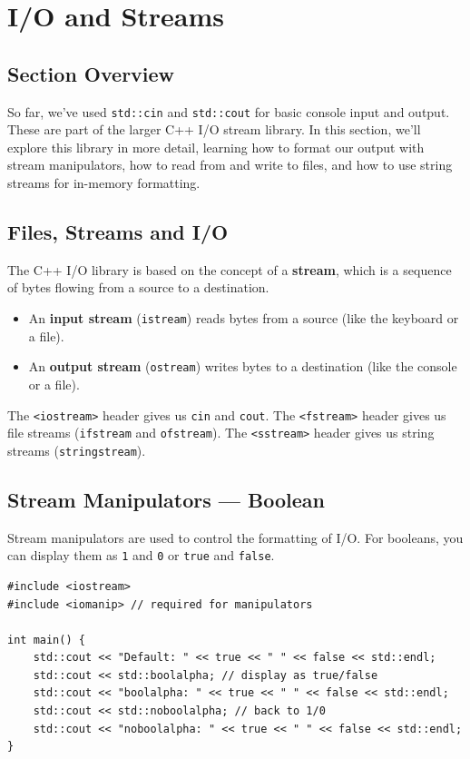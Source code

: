 \section{I/O and Streams}

\subsection{Section Overview}
So far, we've used \texttt{std::cin} and \texttt{std::cout} for basic console input and output. These are part of the larger C++ I/O stream library. In this section, we'll explore this library in more detail, learning how to format our output with stream manipulators, how to read from and write to files, and how to use string streams for in-memory formatting.

\subsection{Files, Streams and I/O}
The C++ I/O library is based on the concept of a \textbf{stream}, which is a sequence of bytes flowing from a source to a destination.
\begin{itemize}
    \item An \textbf{input stream} (\texttt{istream}) reads bytes from a source (like the keyboard or a file).
    \item An \textbf{output stream} (\texttt{ostream}) writes bytes to a destination (like the console or a file).
\end{itemize}
The \texttt{<iostream>} header gives us \texttt{cin} and \texttt{cout}. The \texttt{<fstream>} header gives us file streams (\texttt{ifstream} and \texttt{ofstream}). The \texttt{<sstream>} header gives us string streams (\texttt{stringstream}).

\subsection{Stream Manipulators --- Boolean}
Stream manipulators are used to control the formatting of I/O. For booleans, you can display them as \texttt{1} and \texttt{0} or \texttt{true} and \texttt{false}.
\begin{lstlisting}
#include <iostream>
#include <iomanip> // required for manipulators

int main() {
	std::cout << "Default: " << true << " " << false << std::endl;
	std::cout << std::boolalpha; // display as true/false
	std::cout << "boolalpha: " << true << " " << false << std::endl;
	std::cout << std::noboolalpha; // back to 1/0
	std::cout << "noboolalpha: " << true << " " << false << std::endl;
}
\end{lstlisting}

